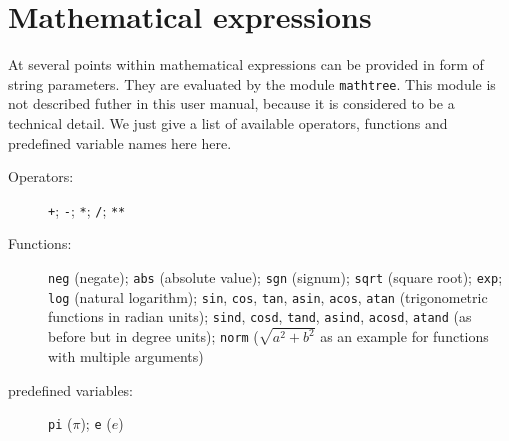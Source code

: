 \chapter{Mathematical expressions}
\label{mathtree}

At several points within \PyX{} mathematical expressions can be
provided in form of string parameters. They are evaluated by the
module \verb|mathtree|. This module is not described futher in this
user manual, because it is considered to be a technical detail. We
just give a list of available operators, functions and predefined
variable names here here.

\begin{description}
\item[Operators:]
\verb|+|; \verb|-|; \verb|*|; \verb|/|; \verb|**|
\item[Functions:]
\verb|neg| (negate); \verb|abs| (absolute value); \verb|sgn| (signum);
\verb|sqrt| (square root); \verb|exp|; \verb|log| (natural logarithm);
\verb|sin|, \verb|cos|, \verb|tan|, \verb|asin|, \verb|acos|,
\verb|atan| (trigonometric functions in radian units); \verb|sind|,
\verb|cosd|, \verb|tand|, \verb|asind|, \verb|acosd|, \verb|atand| (as
before but in degree units); \verb|norm| ($\sqrt{a^2+b^2}$ as an
example for functions with multiple arguments)
\item[predefined variables:]
\verb|pi| ($\pi$); \verb|e| ($e$)
\end{description}
